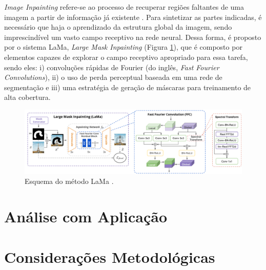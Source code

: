 \textit{Image Inpainting} refere-se ao processo de recuperar regiões faltantes de uma imagem a partir de informação já existente \cite{elharrouss2020image}. Para sintetizar as partes indicadas, é necessário que haja o aprendizado da estrutura global da imagem, sendo imprescindível um vasto campo receptivo na rede neural. Dessa forma, é proposto por \cite{suvorov2022resolution} o sistema LaMa, \textit{Large Mask Inpainting} (Figura \ref{lama}), que é composto por elementos capazes de explorar o campo receptivo apropriado para essa tarefa, sendo eles: i) convoluções rápidas de Fourier (do inglês, \textit{Fast Fourier Convolutions}), ii) o uso de perda perceptual baseada em uma rede de segmentação e iii) uma estratégia de geração de máscaras para treinamento de alta cobertura.

\begin{figure}[h]
    \centering
    \includegraphics[width=\textwidth]{fig/lama.png}
    \caption{Esquema do método LaMa \cite{suvorov2022resolution}.}
    \label{lama}
\end{figure}





\section{Análise com Aplicação}


\section{Considerações Metodológicas}

